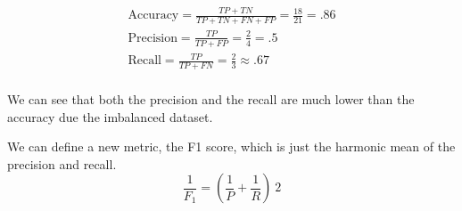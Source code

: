 \begin{gather*}
    \text{Accuracy} = \frac{TP + TN}{TP + TN + FN + FP} = \frac{18}{21} = .86 \\
    \text{Precision} = \frac{TP}{TP + FP} = \frac{2}{4} = .5 \\
    \text{Recall} = \frac{TP}{TP + FN} = \frac{2}{3} \approx .67 \\
\end{gather*}

We can see that both the precision and the recall are much lower than the accuracy due the imbalanced dataset.

We can define a new metric, the F1 score, which is just the harmonic mean of the precision and recall.
$$
\frac{1}{F_1} = (\frac{1}{P} + \frac{1}{R}) \ 2
$$